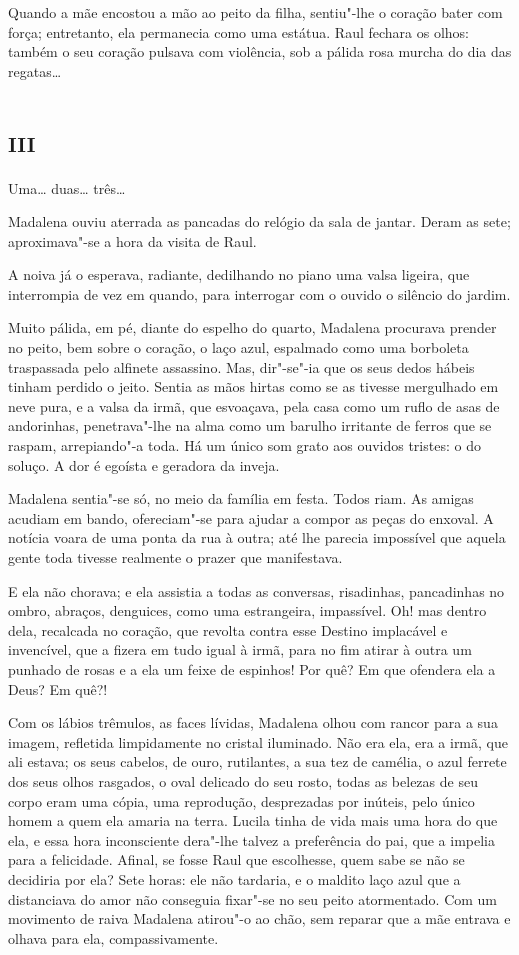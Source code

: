 Quando a mãe encostou a mão ao peito da filha, sentiu"-lhe o coração
bater com força; entretanto, ela permanecia como uma estátua. Raul
fechara os olhos: também o seu coração pulsava com violência, sob a
pálida rosa murcha do dia das regatas\ldots{}

\section*{\textsc{iii}}

Uma\ldots{} duas\ldots{} três\ldots{}

Madalena ouviu aterrada as pancadas do relógio da sala de jantar. Deram
as sete; aproximava"-se a hora da visita de Raul.

A noiva já o esperava, radiante, dedilhando no piano uma valsa ligeira,
que interrompia de vez em quando, para interrogar com o ouvido o
silêncio do jardim.

Muito pálida, em pé, diante do espelho do quarto, Madalena procurava
prender no peito, bem sobre o coração, o laço azul, espalmado como uma
borboleta traspassada pelo alfinete assassino. Mas, dir"-se"-ia que os
seus dedos hábeis tinham perdido o jeito. Sentia as mãos hirtas como se
as tivesse mergulhado em neve pura, e a valsa da irmã, que esvoaçava,
pela casa como um ruflo de asas de andorinhas, penetrava"-lhe na alma
como um barulho irritante de ferros que se raspam, arrepiando"-a toda. Há
um único som grato aos ouvidos tristes: o do soluço. A dor é egoísta e
geradora da inveja.

Madalena sentia"-se só, no meio da família em festa. Todos riam. As
amigas acudiam em bando, ofereciam"-se para ajudar a compor as peças do
enxoval. A notícia voara de uma ponta da rua à outra; até lhe parecia
impossível que aquela gente toda tivesse realmente o prazer que
manifestava.

E ela não chorava; e ela assistia a todas as conversas, risadinhas,
pancadinhas no ombro, abraços, denguices, como uma estrangeira,
impassível. Oh! mas dentro dela, recalcada no coração, que revolta
contra esse Destino implacável e invencível, que a fizera em tudo igual
à irmã, para no fim atirar à outra um punhado de rosas e a ela um feixe
de espinhos! Por quê? Em que ofendera ela a Deus? Em quê?!

Com os lábios trêmulos, as faces lívidas, Madalena olhou com rancor para
a sua imagem, refletida limpidamente no cristal iluminado. Não era ela,
era a irmã, que ali estava; os seus cabelos, de ouro, rutilantes, a sua
tez de camélia, o azul ferrete dos seus olhos rasgados, o oval delicado
do seu rosto, todas as belezas de seu corpo eram uma cópia, uma
reprodução, desprezadas por inúteis, pelo único homem a quem ela amaria
na terra. Lucila tinha de vida mais uma hora do que ela, e essa hora
inconsciente dera"-lhe talvez a preferência do pai, que a impelia para a
felicidade. Afinal, se fosse Raul que escolhesse, quem sabe se não se
decidiria por ela? Sete horas: ele não tardaria, e o maldito laço azul
que a distanciava do amor não conseguia fixar"-se no seu peito
atormentado. Com um movimento de raiva Madalena atirou"-o ao chão, sem
reparar que a mãe entrava e olhava para ela, compassivamente.


